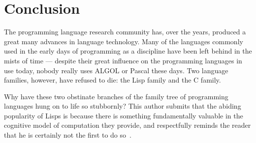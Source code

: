 \documentclass[11pt,a4paper]{article}
\theoremstyle{break}
\begin{document}
%
%
%

\vspace*{-.1in}
\section{Conclusion}
\label{sec:conclusion}
\vspace*{-.1in}

The programming language research community has, over the years, produced a great many advances in language technology. Many of the languages commonly used in the early days of programming as a discipline have been left behind in the mists of time --- despite their great influence on the programming languages in use today, nobody really uses ALGOL or Pascal these days. Two language families, however, have refused to die: the Lisp family and the C family.

Why have these two obstinate branches of the family tree of programming languages hung on to life so stubbornly? This author submits that the abiding popularity of Lisps is because there is something fundamentally valuable in the cognitive model of computation they provide, and respectfully reminds the reader that he is certainly not the first to do so~\cite{sicp,raymond2003become}.
\end{document}
